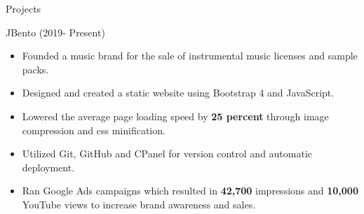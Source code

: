 \documentclass[]{johnsoncv}
\begin{document}
	\begin{cvsection}{Projects}
		\begin{cvsubsection}{JBento (2019- Present)}{}{}
			\begin{itemize}
		\item Founded a music brand for the sale of instrumental music licenses and sample packs.
		\item Designed and created a static website using Bootstrap 4 and JavaScript.
		\item Lowered the average page loading speed by \textbf{25 percent} through image compression and css minification.
		\item Utilized Git, GitHub and CPanel for version control and automatic deployment.
		\item Ran Google Ads campaigns which resulted in \textbf{42,700} impressions and \textbf{10,000} YouTube views to increase brand awareness and sales.

\end{itemize}
\end{cvsubsection}
\end{cvsection}
\end{document}
